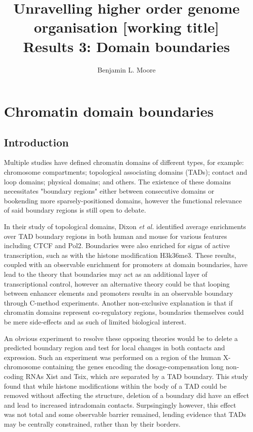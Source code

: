 \documentclass[a4paper,10pt,oneside]{book}
\title{ \vspace{3in} Unravelling higher order genome organisation {\small [working
    title]} \\ \vspace{2em} {\large {\bf Results 3: Domain boundaries}} }
\author{Benjamin L. Moore}
\begin{document}
\maketitle

\chapter{Chromatin domain boundaries}

\section{Introduction}

Multiple studies have defined chromatin domains of different types, for example: chromosome compartments;\cite{Lieberman2009} topological associating domains (TADs);\cite{Dixon2012} contact and loop domains;\cite{Rao2014} physical domains;\cite{Sexton2012, Hou2012} and others.\cite{Filippova2014} The existence of these domains necessitates "boundary regions" either between consecutive domains or bookending more sparsely-positioned domains, however the functional relevance of said boundary regions is still open to debate.

In their study of topological domains, Dixon \emph{et al.} identified average enrichments over TAD boundary regions in both human and mouse for various features including CTCF and Pol2.\cite{Dixon2012} Boundaries were also enriched for signs of active transcription, such as with the histone modification H3k36me3. These results, coupled with an observable enrichment for promoters at domain boundaries, have lead to the theory that boundaries may act as an additional layer of transcriptional control,\cite{Sexton2015} however an alternative theory could be that looping between enhancer elements and promoters results in an observable boundary through C-method experiments.\cite{Rao2014} Another non-exclusive explanation is that if chromatin domains represent co-regulatory regions,\cite{LeDily2014, Nora2013} boundaries themselves could be mere side-effects and as such of limited biological interest.

An obvious experiment to resolve these opposing theories would be to delete a predicted boundary region and test for local changes in both contacts and expression. Such an experiment was performed on a region of the human X-chromosome containing the genes encoding the dosage-compensation long non-coding RNAs Xist and Tsix, which are separated by a TAD boundary.\cite{Nora2012} This study found that while histone modifications within the body of a TAD could be removed without affecting the structure, deletion of a boundary did have an effect and lead to increased intradomain contacts.\cite{Nora2012} Surpsingingly however, this effect was not total and some observable barrier remained, lending evidence that TADs may be centrally constrained, rather than by their borders.\cite{Nora2012} 
\end{document}
